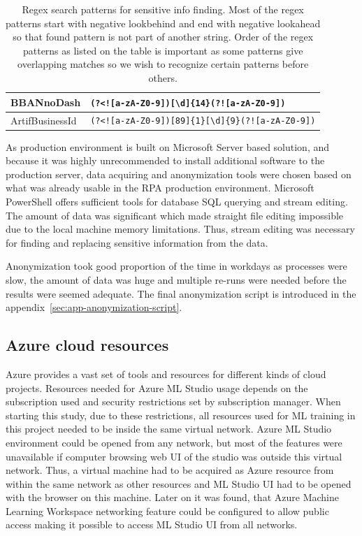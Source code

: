 \begin{table}[]
\begin{tabularx}{\textwidth}{|L{0.18\textwidth}|Y|}
        BBANnoDash &
        \verb=(?<![a-zA-Z0-9])[\d]{14}(?![a-zA-Z0-9])=
        \\ \hline
        ArtifBusinessId &
        \verb=(?<![a-zA-Z0-9])[89]{1}[\d]{9}(?![a-zA-Z0-9])=
        \\ \hline
    \end{tabularx}
    \caption{Regex search patterns for sensitive info finding.
    Most of the regex patterns start with negative lookbehind
    and end with negative lookahead
    so that found pattern is not part of another string.
    Order of the regex patterns as listed on the table is important
    as some patterns give overlapping matches
    so we wish to recognize certain patterns before others.}
    \label{tab:regex-sensitive-regex}
\end{table}

As production environment is built on Microsoft Server based solution,
and because it was highly unrecommended
to install additional software to the production server,
data acquiring and anonymization tools were chosen
based on what was already usable in the RPA production environment.
Microsoft PowerShell offers sufficient tools
for database SQL querying
and stream editing.
The amount of data was significant
which made straight file editing impossible
due to the local machine memory limitations.
Thus, stream editing was necessary
for finding and replacing
sensitive information from the data.

Anonymization took good proportion of the time in workdays
as processes were slow,
the amount of data was huge
and multiple re-runs were needed
before the results were seemed adequate.
The final anonymization script
is introduced in the appendix~\ref{sec:app-anonymization-script}.


\subsection{Azure cloud resources}\label{subsec:meth-azure-cloud resources}

Azure provides a vast set of tools and resources
for different kinds of cloud projects.
Resources needed for Azure ML Studio usage
depends on the subscription used
and security restrictions set by subscription manager.
When starting this study,
due to these restrictions,
all resources used for ML training in this project
needed to be inside the same virtual network.
Azure ML Studio environment could be opened from any network,
but most of the features were unavailable
if computer browsing web UI of the studio was outside this virtual network.
Thus,
a virtual machine had to be acquired as Azure resource
from within the same network as other resources
and ML Studio UI had to be opened with the browser on this machine.
Later on it was found,
that Azure Machine Learning Workspace networking feature
could be configured to allow public access
making it possible to access ML Studio UI from all networks.

